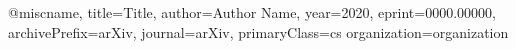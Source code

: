 @misc{name,
      title={Title}, 
      author={Author Name},
      year={2020},
      eprint={0000.00000},
      archivePrefix={arXiv},
      journal={arXiv},
      primaryClass={cs}
      organization={organization}
}
